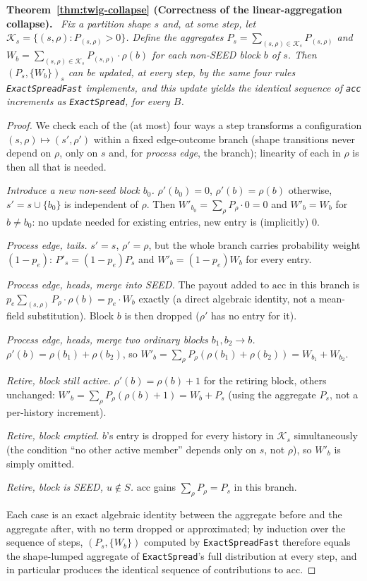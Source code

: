 \documentclass[11pt]{article}
\theoremstyle{definition}
\theoremstyle{remark}
\newenvironment{repeattheorem}[1][]{\par\medskip\noindent\textbf{#1.}\ \itshape}{\par\medskip}
\begin{document}
\begin{repeattheorem}[Theorem~\ref{thm:twig-collapse} (Correctness of the linear-aggregation collapse)]
Fix a partition shape $s$ and, at some step, let
$\mathcal K_s=\{(s,\rho):P_{(s,\rho)}>0\}$. Define the aggregates
$P_s=\sum_{(s,\rho)\in\mathcal K_s}P_{(s,\rho)}$ and
$W_b=\sum_{(s,\rho)\in\mathcal K_s}P_{(s,\rho)}\cdot\rho(b)$ for each
non-SEED block $b$ of $s$. Then $(P_s,\{W_b\})_s$ can be updated, at every
step, by the same four rules \texttt{ExactSpreadFast} implements, and this
update yields the identical sequence of \texttt{acc} increments as
\texttt{ExactSpread}, for every $B$.
\end{repeattheorem}
\begin{proof}
We check each of the (at most) four ways a step transforms a configuration
$(s,\rho)\mapsto(s',\rho')$ within a fixed edge-outcome branch (shape
transitions never depend on $\rho$, only on $s$ and, for
\emph{process edge}, the branch); linearity of each in $\rho$ is then
all that is needed.

\emph{Introduce a new non-seed block $b_0$.} $\rho'(b_0)=0$,
$\rho'(b)=\rho(b)$ otherwise, $s'=s\cup\{b_0\}$ is independent of $\rho$.
Then $W'_{b_0}=\sum_\rho P_\rho\cdot 0=0$ and $W'_b=W_b$ for $b\ne b_0$: no
update needed for existing entries, new entry is (implicitly) $0$.

\emph{Process edge, tails.} $s'=s$, $\rho'=\rho$, but the whole branch
carries probability weight $(1-p_e)$: $P'_s=(1-p_e)P_s$ and
$W'_b=(1-p_e)W_b$ for every entry.

\emph{Process edge, heads, merge into SEED.} The payout added to
$\mathrm{acc}$ in this branch is
$p_e\sum_{(s,\rho)}P_\rho\cdot\rho(b)=p_e\cdot W_b$ exactly (a direct
algebraic identity, not a mean-field substitution). Block $b$ is then
dropped ($\rho'$ has no entry for it).

\emph{Process edge, heads, merge two ordinary blocks $b_1,b_2\to b$.}
$\rho'(b)=\rho(b_1)+\rho(b_2)$, so
$W'_b=\sum_\rho P_\rho(\rho(b_1)+\rho(b_2))=W_{b_1}+W_{b_2}$.

\emph{Retire, block still active.} $\rho'(b)=\rho(b)+1$ for the retiring
block, others unchanged: $W'_b=\sum_\rho P_\rho(\rho(b)+1)=W_b+P_s$ (using
the aggregate $P_s$, not a per-history increment).

\emph{Retire, block emptied.} $b$'s entry is dropped for every history in
$\mathcal K_s$ simultaneously (the condition ``no other active member''
depends only on $s$, not $\rho$), so $W'_b$ is simply omitted.

\emph{Retire, block is SEED, $u\notin S$.} $\mathrm{acc}$ gains
$\sum_\rho P_\rho=P_s$ in this branch.

Each case is an exact algebraic identity between the aggregate before and
the aggregate after, with no term dropped or approximated; by induction
over the sequence of steps, $(P_s,\{W_b\})$ computed by
\texttt{ExactSpreadFast} therefore equals the shape-lumped aggregate of
\texttt{ExactSpread}'s full distribution at every step, and in particular
produces the identical sequence of contributions to $\mathrm{acc}$.
\end{proof}
\end{document}
